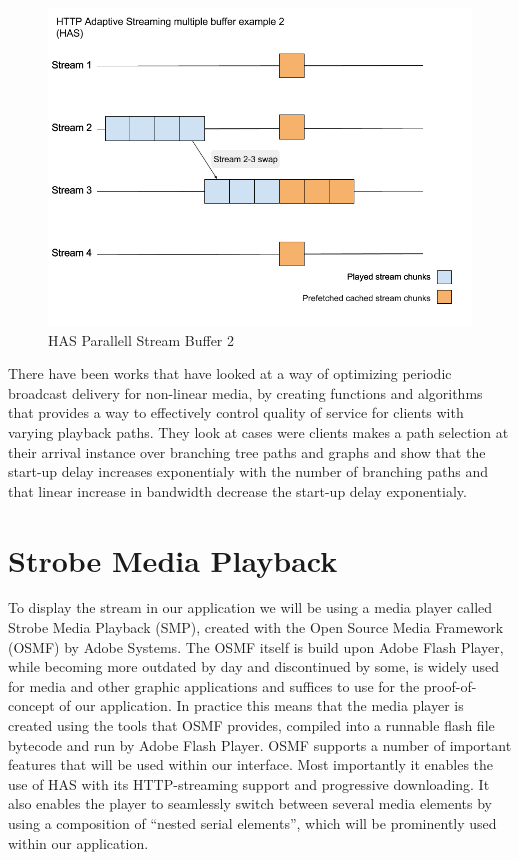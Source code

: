 \begin{figure}[!ht]
\begin{center}
\includegraphics[scale=0.4]{HAS2.png}
\caption{HAS Parallell Stream Buffer 2}
\label{fig:HAS2}
\end{center}
\end{figure}

There have been works that have looked at a way of optimizing periodic broadcast delivery for non-linear media, by creating functions and algorithms that provides a way to effectively control quality of service for clients with varying playback paths. They look at cases were clients makes a path selection at their arrival instance over branching tree paths and graphs and show that the start-up delay increases exponentialy with the number of branching paths and that linear increase in bandwidth decrease the start-up delay exponentialy\cite{optimizedbroadcast}.


\section{Strobe Media Playback}
\label{sec:smp}

To display the stream in our application we will be using a media player called Strobe Media Playback (SMP), created with the Open Source Media Framework (OSMF) by Adobe Systems. The OSMF itself is build upon Adobe Flash Player, while becoming more outdated by day and discontinued by some, is widely used for media and other graphic applications and suffices to use for the proof-of-concept of our application. In practice this means that the media player is created using the tools that OSMF provides, compiled into a runnable flash file bytecode and run by Adobe Flash Player. 
OSMF supports a number of important features that will be used within our interface. Most importantly it enables the use of HAS with its HTTP-streaming support and progressive downloading. It also enables the player to seamlessly switch between several media elements by using a composition of “nested serial elements”, which will be prominently used within our application\cite{osmf}.

